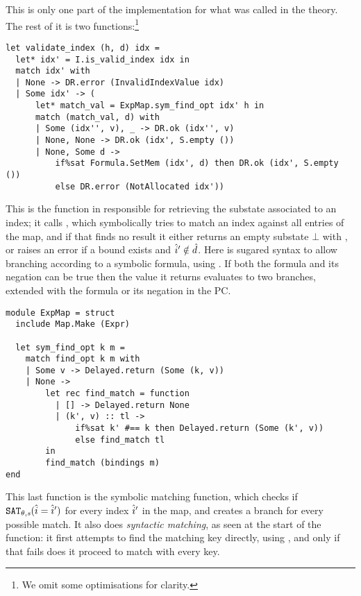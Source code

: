 This is only one part of the implementation for what was called  in the theory. The rest of it is two functions:\footnote{We omit some optimisations for clarity.} \begin{lstlisting}
let validate_index (h, d) idx =
  let* idx' = I.is_valid_index idx in
  match idx' with
  | None -> DR.error (InvalidIndexValue idx)
  | Some idx' -> (
      let* match_val = ExpMap.sym_find_opt idx' h in
      match (match_val, d) with
      | Some (idx'', v), _ -> DR.ok (idx'', v)
      | None, None -> DR.ok (idx', S.empty ())
      | None, Some d ->
          if%sat Formula.SetMem (idx', d) then DR.ok (idx', S.empty ())
          else DR.error (NotAllocated idx'))
\end{lstlisting}
This is the function in \PMap{} responsible for retrieving the substate associated to an index; it calls , which symbolically tries to match an index against all entries of the map, and if that finds no result it either returns an empty substate $\bot$ with , or raises an error if a bound exists and $\hat{i}'\notin \hat{d}$. Here  is sugared syntax to allow branching according to a symbolic formula, using . If both the formula and its negation can be true then the value it returns evaluates to two branches, extended with the formula or its negation in the PC.
\begin{lstlisting}
module ExpMap = struct
  include Map.Make (Expr)
  
  let sym_find_opt k m =
    match find_opt k m with
    | Some v -> Delayed.return (Some (k, v))
    | None ->
        let rec find_match = function
          | [] -> Delayed.return None
          | (k', v) :: tl ->
              if%sat k' #== k then Delayed.return (Some (k', v))
              else find_match tl
        in
        find_match (bindings m)
end
\end{lstlisting}
This last function is the symbolic matching function, which checks if $\texttt{SAT}_{\mathit{\theta,s}}(\hat{i} = \hat{i}')$ for every index $\hat{i}'$ in the map, and creates a branch for every possible match. It also does \emph{syntactic matching}, as seen at the start of the function: it first attempts to find the matching key directly, using , and only if that fails does it proceed to match with every key.

